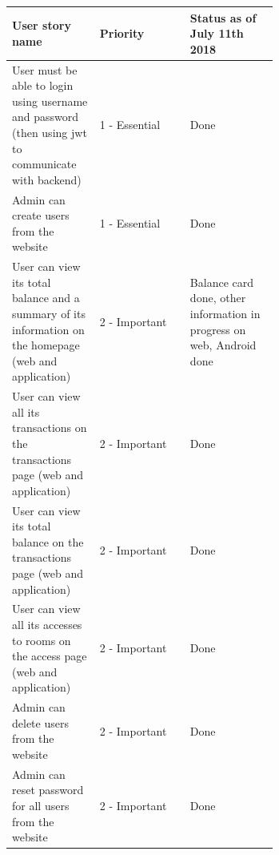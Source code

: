 \documentclass[twoside, openright,11pt,a4paper]{book}
\begin{document}
\renewcommand*{\arraystretch}{1.5}
\begin{longtable}[c]{|p{0.33\linewidth}|l|p{0.33\linewidth}|}
\hline
\textbf{User story name}                                                                                                                       & \textbf{Priority} & \textbf{Status as of July 11th 2018}                \\ \hline
\endhead
%
User must be able to login using username and password (then using \gls{jwt} to communicate with backend)                                            & 1 - Essential     & Done                                             \\ \hline
Admin can create users from the website                                                                                                        & 1 - Essential     & Done                                             \\ \hline
User can view its total balance and a summary of its information on the homepage (web and application)                                         & 2 - Important     & Balance card done, other information in progress on web, Android done                                             \\ \hline
User can view all its transactions on the transactions page (web and application)                                                              & 2 - Important     & Done                                             \\ \hline
User can view its total balance on the transactions page (web and application)                                                                 & 2 - Important     & Done                                             \\ \hline
User can view all its accesses to rooms on the access page (web and application)                                                               & 2 - Important     & Done                                             \\ \hline
Admin can delete users from the website                                                                                                        & 2 - Important     & Done                                             \\ \hline
Admin can reset password for all users from the website                                                                                        & 2 - Important     & Done                                             \\ \hline

\end{longtable}
\end{document}
